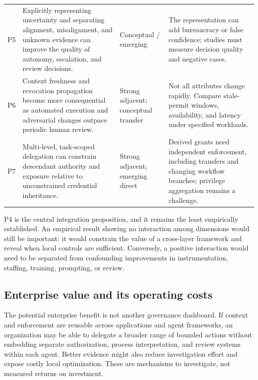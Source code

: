 \documentclass[11pt,letterpaper]{article}
\begin{document}
\begin{longtable}{p{} p{} p{} p{}}
P5 & Explicitly representing uncertainty and separating alignment, misalignment, and unknown evidence can improve the quality of autonomy, escalation, and review decisions. & Conceptual / emerging & The representation can add bureaucracy or false confidence; studies must measure decision quality and negative cases. \\
P6 & Context freshness and revocation propagation become more consequential as automated execution and adversarial changes outpace periodic human review. & Strong adjacent; conceptual transfer & Not all attributes change rapidly. Compare stale-permit windows, availability, and latency under specified workloads. \\
P7 & Multi-level, task-scoped delegation can constrain descendant authority and exposure relative to unconstrained credential inheritance. & Strong adjacent; emerging direct & Derived grants need independent enforcement, including transfers and changing workflow branches; privilege aggregation remains a challenge. \\
\bottomrule
\end{longtable}
\endgroup

P4 is the central integration proposition, and it remains the least empirically established. An empirical result showing no interaction among dimensions would still be important: it would constrain the value of a cross-layer framework and reveal when local controls are sufficient. Conversely, a positive interaction would need to be separated from confounding improvements in instrumentation, staffing, training, prompting, or review.

\subsection{Enterprise value and its operating costs}
The potential enterprise benefit is not another governance dashboard. If context and enforcement are reusable across applications and agent frameworks, an organization may be able to delegate a broader range of bounded actions without embedding separate authorization, process interpretation, and review systems within each agent. Better evidence might also reduce investigation effort and expose costly local optimization. These are mechanisms to investigate, not measured returns on investment.
\end{document}
